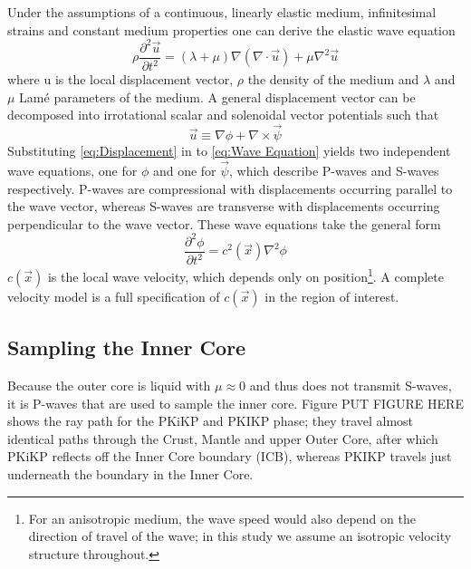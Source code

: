 \documentclass[11pt,a4paper]{article}
\begin{document}
Under the assumptions of a continuous, linearly elastic medium, infinitesimal strains and constant medium properties one can derive the elastic wave equation
\begin{equation}
	\rho \frac{\partial^{2} \vec{u}}{\partial t^{2}} = \left ( \lambda + \mu \right ) \nabla \left ( \nabla \cdot \vec{u} \right ) + \mu \nabla^{2} \vec{u}
	\label{eq:Wave Equation}
\end{equation}
where u is the local displacement vector, $\rho$ the density of the medium and $\lambda$ and $\mu$  Lam\'{e} parameters of the medium. A general displacement vector can be decomposed into irrotational scalar and solenoidal vector potentials such that
\begin{equation}
	\vec{u} \equiv \nabla \phi + \nabla \times \vec{\psi}
	\label{eq:Displacement}
\end{equation}
Substituting \eqref{eq:Displacement} in to \eqref{eq:Wave Equation} yields two independent wave equations, one for $\phi$ and one for $\vec{\psi}$, which describe P-waves and S-waves respectively. P-waves are compressional with displacements occurring parallel to the wave vector, whereas S-waves are transverse with displacements occurring perpendicular to the wave vector. These wave equations take the general form
\begin{equation}
	\frac{\partial^{2} \phi}{\partial t^{2}} = c^{2} \left ( \vec{x} \right ) \nabla^{2} \phi
\end{equation}
$c(\vec{x})$ is the local wave velocity, which depends only on position\footnote{For an anisotropic medium, the wave speed would also depend on the direction of travel of the wave; in this study we assume an isotropic velocity structure throughout.}. A complete velocity model is a full specification of $c(\vec{x})$ in the region of interest.

\subsection{Sampling the Inner Core}
\label{sec:Sampling}
Because the outer core is liquid with $\mu \approx 0$ and thus does not transmit S-waves, it is P-waves that are used to sample the inner core. Figure PUT FIGURE HERE shows the ray path for the PKiKP and PKIKP phase; they travel almost identical paths through the Crust, Mantle and upper Outer Core, after which PKiKP reflects off the Inner Core boundary (ICB), whereas PKIKP travels just underneath the boundary in the Inner Core.
\end{document}
